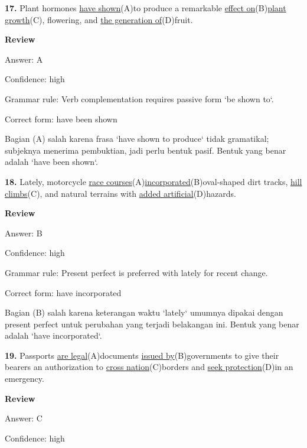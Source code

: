 \documentclass[12pt]{article}
\begin{document}
\endgroup
\par
\vspace{\questionblockgap}
\noindent\textbf{17.} Plant hormones \uline{have shown}(A)to produce a remarkable \uline{effect on}(B)\uline{plant growth}(C), flowering, and \uline{the generation of}(D)fruit.
\par
\begingroup
\setlength{\parskip}{0pt}
\setlength{\parindent}{0pt}
\textbf{Review}\par
Answer: A\par
Confidence: high\par
Grammar rule: Verb complementation requires passive form `be shown to`.\par
Correct form: have been shown\par
Bagian (A) salah karena frasa `have shown to produce` tidak gramatikal; subjeknya menerima pembuktian, jadi perlu bentuk pasif. Bentuk yang benar adalah `have been shown`.\par
\endgroup
\par
\vspace{\questionblockgap}
\noindent\textbf{18.} Lately, motorcycle \uline{race courses}(A)\uline{incorporated}(B)oval-shaped dirt tracks, \uline{hill climbs}(C), and natural terrains with \uline{added artificial}(D)hazards.
\par
\begingroup
\setlength{\parskip}{0pt}
\setlength{\parindent}{0pt}
\textbf{Review}\par
Answer: B\par
Confidence: high\par
Grammar rule: Present perfect is preferred with lately for recent change.\par
Correct form: have incorporated\par
Bagian (B) salah karena keterangan waktu `lately` umumnya dipakai dengan present perfect untuk perubahan yang terjadi belakangan ini. Bentuk yang benar adalah `have incorporated`.\par
\endgroup
\par
\vspace{\questionblockgap}
\noindent\textbf{19.} Passports \uline{are legal}(A)documents \uline{issued by}(B)governments to give their bearers an authorization to \uline{cross nation}(C)borders and \uline{seek protection}(D)in an emergency.
\par
\begingroup
\setlength{\parskip}{0pt}
\setlength{\parindent}{0pt}
\textbf{Review}\par
Answer: C\par
Confidence: high\par
\end{document}
